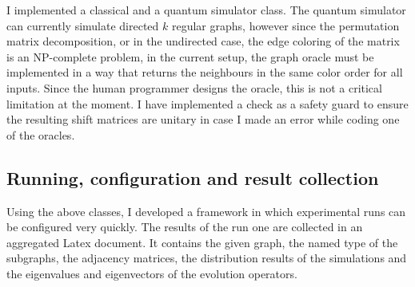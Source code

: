 I implemented a classical and a quantum simulator class. The quantum simulator can currently simulate directed $k$ regular graphs, however since the permutation matrix decomposition, or in the undirected case, the edge coloring of the matrix is an NP-complete problem, in the current setup, the graph oracle must be implemented in a way that returns the neighbours in the same color order for all inputs. Since the human programmer designs the oracle, this is not a critical limitation at the moment. I have implemented a check as a safety guard to ensure the resulting shift matrices are unitary in case I made an error while coding one of the oracles.

\subsection{Running, configuration and result collection}

Using the above classes, I developed a framework in which experimental runs can be configured very quickly. The results of the run one are collected in an aggregated Latex document. It contains the given graph, the named type of the subgraphs, the adjacency matrices, the distribution results of the simulations and the eigenvalues and eigenvectors of the evolution operators. 

